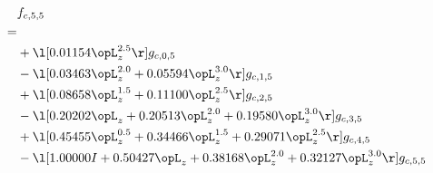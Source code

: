 \begin{alignat}{2} 
\label{eq:f_55_0} 
& f_{c,5,5} \nonumber \\ 
 = \\ 
& + \l[  0.01154 \opL_z^{2.5}  \r] g_{c,0,5} \nonumber \\ 
& - \l[  0.03463 \opL_z^{2.0} +  0.05594 \opL_z^{3.0}  \r] g_{c,1,5} \nonumber \\ 
& + \l[  0.08658 \opL_z^{1.5} +  0.11100 \opL_z^{2.5}  \r] g_{c,2,5} \nonumber \\ 
& - \l[  0.20202 \opL_z +  0.20513 \opL_z^{2.0} +  0.19580 \opL_z^{3.0}  \r] g_{c,3,5} \nonumber \\ 
& + \l[  0.45455 \opL_z^{0.5} +  0.34466 \opL_z^{1.5} +  0.29071 \opL_z^{2.5}  \r] g_{c,4,5} \nonumber \\ 
& - \l[  1.00000 I +  0.50427 \opL_z +  0.38168 \opL_z^{2.0} +  0.32127 \opL_z^{3.0}  \r] g_{c,5,5} \nonumber \\ 
\end{alignat} 


